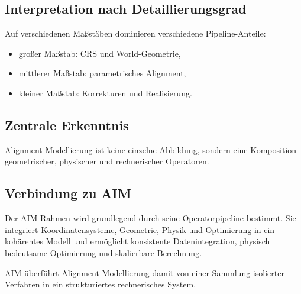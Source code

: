 \subsection{Interpretation nach Detaillierungsgrad}
Auf verschiedenen Maßstäben dominieren verschiedene Pipeline-Anteile:
\begin{itemize}
\item großer Maßstab: CRS und World-Geometrie,
\item mittlerer Maßstab: parametrisches Alignment,
\item kleiner Maßstab: Korrekturen und Realisierung.
\end{itemize}

\subsection{Zentrale Erkenntnis}
\begin{proposition}
Alignment-Modellierung ist keine einzelne Abbildung, sondern eine Komposition
geometrischer, physischer und rechnerischer Operatoren.
\end{proposition}

\subsection{Verbindung zu AIM}
\begin{summary}
Der AIM-Rahmen wird grundlegend durch seine Operatorpipeline bestimmt. Sie
integriert Koordinatensysteme, Geometrie, Physik und Optimierung in ein
kohärentes Modell und ermöglicht konsistente Datenintegration, physisch
bedeutsame Optimierung und skalierbare Berechnung.

AIM überführt Alignment-Modellierung damit von einer Sammlung isolierter
Verfahren in ein strukturiertes rechnerisches System.
\end{summary}

